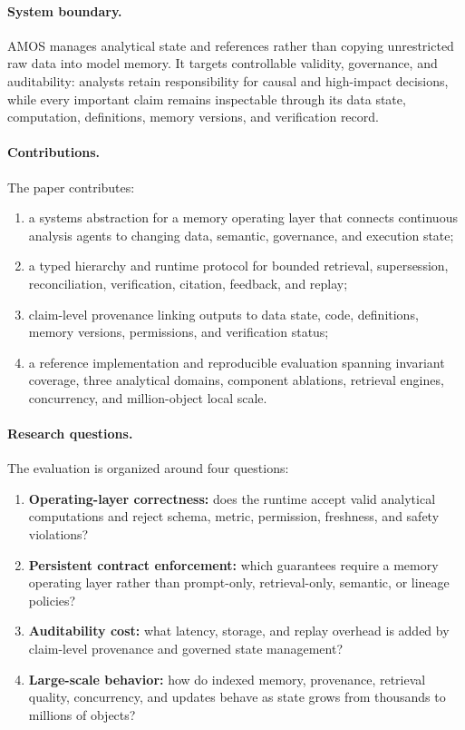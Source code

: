 \documentclass[10pt]{article}
\newcommand{\amos}{\textsc{AMOS}\xspace}
\begin{document}
\paragraph{System boundary.} \amos manages analytical state and references rather than copying unrestricted raw data into model memory. It targets controllable validity, governance, and auditability: analysts retain responsibility for causal and high-impact decisions, while every important claim remains inspectable through its data state, computation, definitions, memory versions, and verification record.

\paragraph{Contributions.} The paper contributes:
\begin{enumerate}
    \item a systems abstraction for a memory operating layer that connects continuous analysis agents to changing data, semantic, governance, and execution state;
    \item a typed hierarchy and runtime protocol for bounded retrieval, supersession, reconciliation, verification, citation, feedback, and replay;
    \item claim-level provenance linking outputs to data state, code, definitions, memory versions, permissions, and verification status;
    \item a reference implementation and reproducible evaluation spanning invariant coverage, three analytical domains, component ablations, retrieval engines, concurrency, and million-object local scale.
\end{enumerate}

\paragraph{Research questions.} The evaluation is organized around four questions:
\begin{enumerate}
    \item[RQ1.] \textbf{Operating-layer correctness:} does the runtime accept valid analytical computations and reject schema, metric, permission, freshness, and safety violations?
    \item[RQ2.] \textbf{Persistent contract enforcement:} which guarantees require a memory operating layer rather than prompt-only, retrieval-only, semantic, or lineage policies?
    \item[RQ3.] \textbf{Auditability cost:} what latency, storage, and replay overhead is added by claim-level provenance and governed state management?
    \item[RQ4.] \textbf{Large-scale behavior:} how do indexed memory, provenance, retrieval quality, concurrency, and updates behave as state grows from thousands to millions of objects?
\end{enumerate}
\end{document}
